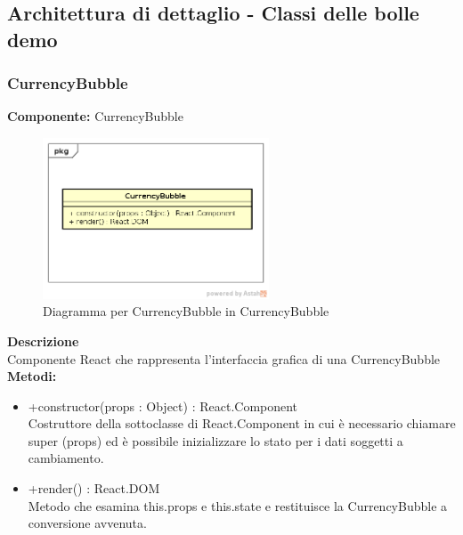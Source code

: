 \subsection{Architettura di dettaglio - Classi delle bolle demo}\subsubsection{CurrencyBubble}
\textbf{Componente:}  CurrencyBubble\\
   \FloatBarrier
   \begin{figure}[ht]
   \centering
   \includegraphics[width=0.6\textwidth]{img/single-CurrencyBubble.png}
   \caption{{Diagramma per CurrencyBubble in CurrencyBubble}}
\end{figure}
\FloatBarrier
\textbf{Descrizione}\\
Componente React che rappresenta l'interfaccia grafica di una CurrencyBubble
\\
\textbf{Metodi:} 
\begin{itemize}
\item +constructor(props : Object) : React.Component 
\\
Costruttore della sottoclasse di React.Component in cui è necessario chiamare super (props) ed è possibile inizializzare lo stato per i dati soggetti a cambiamento.

\item +render() : React.DOM 
\\
Metodo che esamina this.props e this.state e restituisce la CurrencyBubble a conversione avvenuta.

\end{itemize} 


